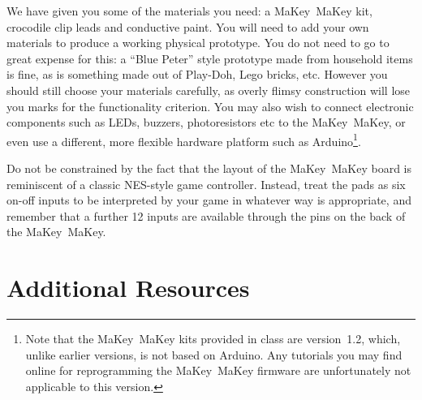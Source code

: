 \documentclass{../fal_assignment}
\begin{document}
We have given you some of the materials you need: a MaKey~MaKey kit, crocodile clip leads and conductive paint.
You will need to add your own materials to produce a working physical prototype.
You do not need to go to great expense for this: a ``Blue Peter'' style prototype made from
household items is fine, as is something made out of Play-Doh, Lego bricks, etc.
However you should still choose your materials carefully, as overly flimsy construction will
lose you marks for the functionality criterion.
You may also wish to connect electronic components such as LEDs, buzzers, photoresistors etc to the MaKey~MaKey,
or even use a different, more flexible hardware platform such as Arduino\footnote{
Note that the MaKey~MaKey kits provided in class are version~1.2, which, unlike earlier versions, is not based on Arduino.
Any tutorials you may find online for reprogramming the MaKey~MaKey firmware are unfortunately not applicable
to this version.
}.

Do not be constrained by the fact that the layout of the MaKey~MaKey board is reminiscent of a
classic NES-style game controller.
Instead, treat the pads as six on-off inputs to be interpreted by your game in whatever way is appropriate,
and remember that a further 12 inputs are available through the pins on the back of the MaKey~MaKey.

\section*{Additional Resources}
\end{document}
